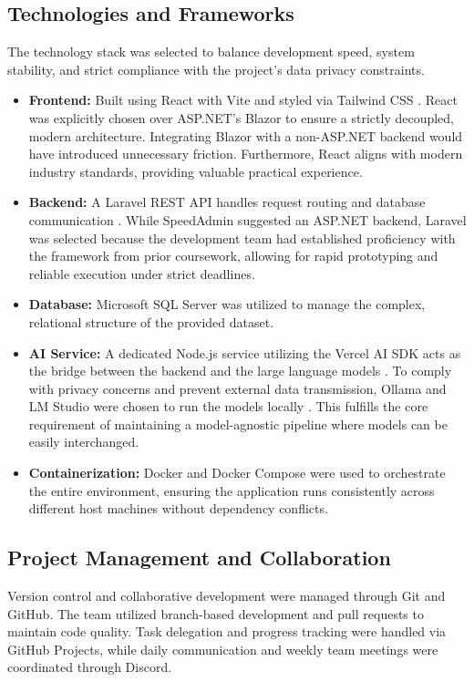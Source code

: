 \subsection{Technologies and Frameworks}
The technology stack was selected to balance development speed, system stability, and strict compliance with the project's data privacy constraints.
\begin{itemize}
    \item \textbf{Frontend:} Built using React with Vite and styled via Tailwind CSS \cite{react_docs}. React was explicitly chosen over ASP.NET's Blazor to ensure a strictly decoupled, modern architecture. Integrating Blazor with a non-ASP.NET backend would have introduced unnecessary friction. Furthermore, React aligns with modern industry standards, providing valuable practical experience.
    \item \textbf{Backend:} A Laravel REST API handles request routing and database communication \cite{laravel_docs}. While SpeedAdmin suggested an ASP.NET backend, Laravel was selected because the development team had established proficiency with the framework from prior coursework, allowing for rapid prototyping and reliable execution under strict deadlines.
    \item \textbf{Database:} Microsoft SQL Server was utilized to manage the complex, relational structure of the provided dataset.
    \item \textbf{AI Service:} A dedicated Node.js service utilizing the Vercel AI SDK acts as the bridge between the backend and the large language models \cite{vercel_ai}. To comply with privacy concerns and prevent external data transmission, Ollama and LM Studio were chosen to run the models locally \cite{ollama_docs}. This fulfills the core requirement of maintaining a model-agnostic pipeline where models can be easily interchanged.
    \item \textbf{Containerization:} Docker and Docker Compose were used to orchestrate the entire environment, ensuring the application runs consistently across different host machines without dependency conflicts.
\end{itemize}

\subsection{Project Management and Collaboration}
Version control and collaborative development were managed through Git and GitHub. The team utilized branch-based development and pull requests to maintain code quality. Task delegation and progress tracking were handled via GitHub Projects, while daily communication and weekly team meetings were coordinated through Discord.


